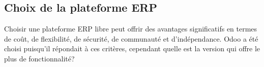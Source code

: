 


\subsection{Choix de la plateforme ERP}

Choisir une plateforme ERP libre peut offrir des avantages significatifs en termes de coût, de flexibilité, de sécurité, de communauté et d'indépendance. Odoo a été choisi puisqu'il répondait à ces critères, cependant quelle est la version qui offre le plus de fonctionnalité?

